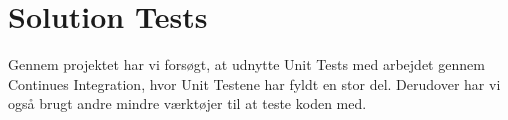 
\section{Solution Tests}
Gennem projektet har vi forsøgt, at udnytte Unit Tests med arbejdet gennem Continues Integration, hvor Unit Testene har fyldt en stor del.
Derudover har vi også brugt andre mindre værktøjer til at teste koden med.


 